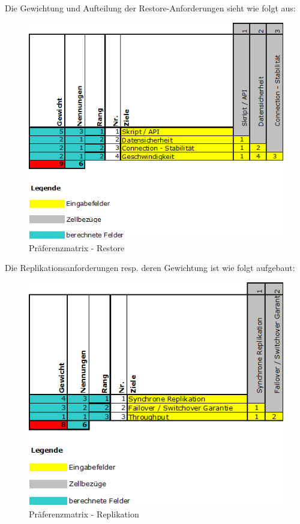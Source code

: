 \begin{flushleft}
    Die Gewichtung und Aufteilung der Restore-Anforderungen sieht wie folgt aus:
    \begin{figure}[H]
        \centering
        \includegraphics[width=0.75\linewidth]{source/implementation/evaluation/requirements/preference_matrix_restore}
        \caption{Präferenzmatrix - Restore}
        \label{fig:preference_matrix_restore}
    \end{figure}
\end{flushleft}
\begin{flushleft}
    Die Replikationsanforderungen resp.
    deren Gewichtung ist wie folgt aufgebaut:
    \begin{figure}[H]
        \centering
        \includegraphics[width=0.75\linewidth]{source/implementation/evaluation/requirements/preference_matrix_replication}
        \caption{Präferenzmatrix - Replikation}
        \label{fig:preference_matrix_replication}
    \end{figure}
\end{flushleft}
